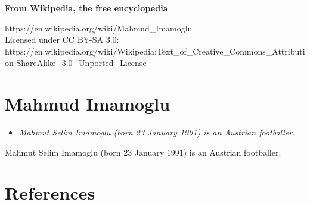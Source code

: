 \textbf{From Wikipedia, the free encyclopedia}

https://en.wikipedia.org/wiki/Mahmud\_Imamoglu\\
Licensed under CC BY-SA 3.0:\\
https://en.wikipedia.org/wiki/Wikipedia:Text\_of\_Creative\_Commons\_Attribution-ShareAlike\_3.0\_Unported\_License

\section{Mahmud Imamoglu}\label{mahmud-imamoglu}

\begin{itemize}
\item
  \emph{Mahmut Selim Imamoglu (born 23 January 1991) is an Austrian
  footballer.}
\end{itemize}

Mahmut Selim Imamoglu (born 23 January 1991) is an Austrian footballer.

\section{References}\label{references}
